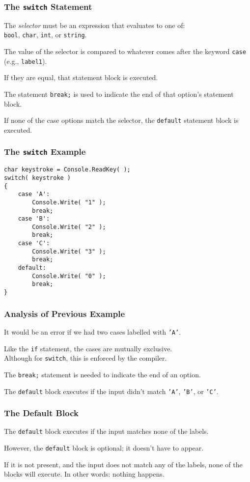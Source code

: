 \begin{frame}
\frametitle{The \texttt{switch} Statement}

The \textit{selector} must be an expression that evaluates to one of: \\
\quad \texttt{bool}, \texttt{char}, \texttt{int}, or \texttt{string}.


The value of the selector is compared to whatever comes after the keyword \texttt{case} (e.g., \texttt{label1}).

If they are equal, that statement block is executed.

The statement \texttt{break;} is used to indicate the end of that option's statement block.

If none of the case options match the selector, the \texttt{default} statement block is executed.

\end{frame}

\begin{frame}[fragile]
\frametitle{The \texttt{switch} Example}

\begin{verbatim}
char keystroke = Console.ReadKey( );
switch( keystroke )
{
    case 'A':
        Console.Write( "1" );
        break;
    case 'B':
        Console.Write( "2" );
        break;
    case 'C':
        Console.Write( "3" );
        break;
    default:
        Console.Write( "0" );
        break;
}
\end{verbatim}

\end{frame}

\begin{frame}
\frametitle{Analysis of Previous Example}

It would be an error if we had two cases labelled with \texttt{'A'}.

Like the \texttt{if} statement, the cases are mutually exclusive.\\
\quad Although for \texttt{switch}, this is enforced by the compiler.

The \texttt{break;} statement is needed to indicate the end of an option. 

The \texttt{default} block executes if the input didn't match \texttt{'A'}, \texttt{'B'}, or \texttt{'C'}.

\end{frame}

\begin{frame}
\frametitle{The Default Block}
The \texttt{default} block executes if the input matches none of the labels.

However, the \texttt{default} block is optional; it doesn't have to appear.

If it is not present, and the input does not match any of the labels, none of the blocks will execute. In other words: nothing happens.

\end{frame}


